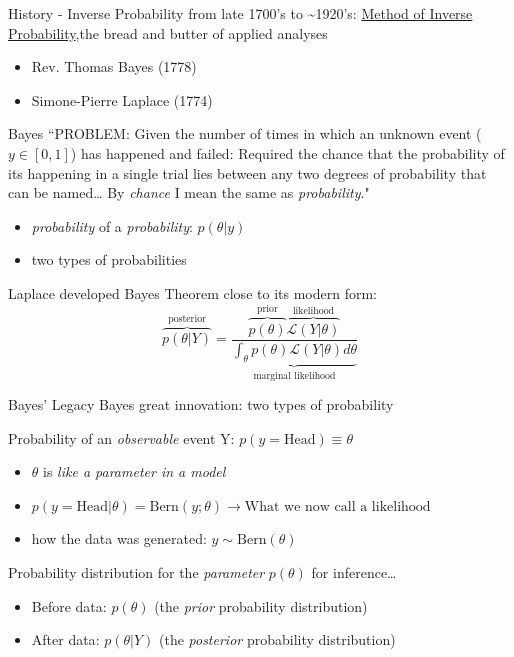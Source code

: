 \documentclass[presentation,9pt,xcolor=dvipsnames]{beamer}
\begin{document}
\begin{frame}[label={sec:orgf1309a8}]{History - Inverse Probability}
from late 1700's to \textasciitilde{}1920's: \uline{Method of Inverse Probability},the bread and butter of applied analyses
\begin{itemize}
\item Rev. Thomas Bayes (1778)
\item Simone-Pierre Laplace (1774)
\end{itemize}
\begin{block}{Bayes}
``PROBLEM: Given the number of times in which an unknown event (\(y\in[0,1]\)) has happened and failed: Required the \alert{chance} that the probability of its happening in a single trial lies between any two degrees of probability that can be named\ldots{} By \emph{chance} I mean the same as \emph{probability}."
\begin{itemize}
\item \emph{probability} of a \emph{probability}: \(p(\theta\vert y)\)
\item two types of probabilities
\end{itemize}
\end{block}
\begin{block}{Laplace}
developed Bayes Theorem close to its modern form:
\begin{equation}
\overbrace{p(\theta\vert Y)}^{\text{posterior}} = \frac{\overbrace{p(\theta)}^{\text{prior}}\overbrace{\mathcal{L}(Y\vert \theta)}^{\text{likelihood}}}{\underbrace{\int_\theta p(\theta)\mathcal{L}(Y\vert \theta)d\theta}_{\text{marginal likelihood}}} 
\end{equation}
\end{block}
\end{frame}
\begin{frame}[label={sec:org2f82c26}]{Bayes' Legacy}
Bayes great innovation: two types of probability
\begin{block}{Probability of an \emph{observable} event Y:}
\(p(y\!=\!\text{Head}) \equiv \theta\)
\begin{itemize}
\item \(\theta\) is \emph{like a parameter in a model}
\item \(p(y\!=\!\text{Head}\vert \theta) = \text{Bern}(y;\theta)\rightarrow\text{What we now call a likelihood}\)
\item how the data was generated: \(y\sim\text{Bern}(\theta)\)
\end{itemize}
\end{block}
\begin{block}{Probability distribution for the \emph{parameter} \(p(\theta)\)}
for inference\ldots{}
\begin{itemize}
\item \alert{Before data}: \(p(\theta)\) (the \emph{prior} probability distribution)
\item \alert{After data}: \(p(\theta\vert Y)\) (the \emph{posterior} probability distribution)
\end{itemize}
\end{block}
\end{frame}
\end{document}

